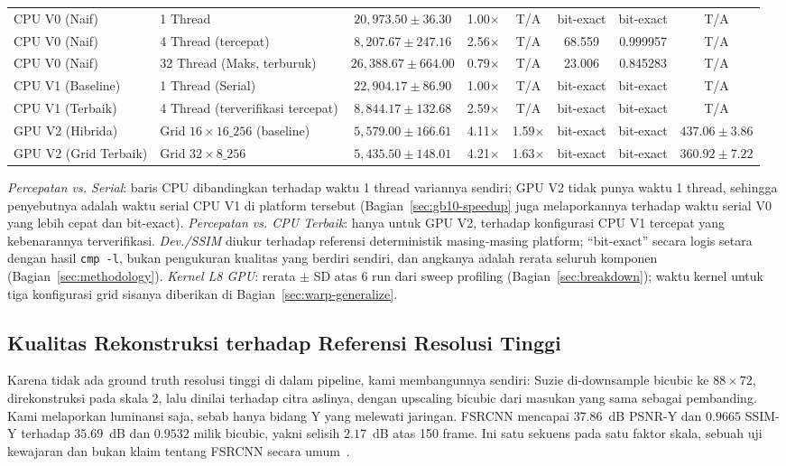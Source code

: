\documentclass[conference]{IEEEtran}
\begin{document}
\begin{table}[htbp]
{\begin{tabular}{llcccccc}
CPU V0 (Naif) & 1 Thread & $20{,}973.50 \pm 36.30$ & 1.00$\times$ & T/A & bit-exact & bit-exact & T/A \\
CPU V0 (Naif) & 4 Thread (tercepat) & $8{,}207.67 \pm 247.16$ & 2.56$\times$ & T/A & 68.559 & 0.999957 & T/A \\
CPU V0 (Naif) & 32 Thread (Maks, terburuk) & $26{,}388.67 \pm 664.00$ & 0.79$\times$ & T/A & 23.006 & 0.845283 & T/A \\
CPU V1 (Baseline) & 1 Thread (Serial) & $22{,}904.17 \pm 86.90$ & 1.00$\times$ & T/A & bit-exact & bit-exact & T/A \\
CPU V1 (Terbaik) & 4 Thread (terverifikasi tercepat) & $8{,}844.17 \pm 132.68$ & 2.59$\times$ & T/A & bit-exact & bit-exact & T/A \\
GPU V2 (Hibrida) & Grid $16{\times}16\_256$ (baseline) & $5{,}579.00 \pm 166.61$ & 4.11$\times$ & 1.59$\times$ & bit-exact & bit-exact & $437.06 \pm 3.86$ \\
GPU V2 (Grid Terbaik) & Grid $32{\times}8\_256$ & $5{,}435.50 \pm 148.01$ & 4.21$\times$ & 1.63$\times$ & bit-exact & bit-exact & $360.92 \pm 7.22$ \\
\bottomrule
\end{tabular}%
}

\vspace{2mm}
\footnotesize{\emph{Percepatan vs. Serial}: baris CPU dibandingkan terhadap waktu 1 thread variannya sendiri; GPU V2 tidak punya waktu 1 thread, sehingga penyebutnya adalah waktu serial CPU V1 di platform tersebut (Bagian~\ref{sec:gb10-speedup} juga melaporkannya terhadap waktu serial V0 yang lebih cepat dan bit-exact). \emph{Percepatan vs. CPU Terbaik}: hanya untuk GPU V2, terhadap konfigurasi CPU V1 tercepat yang kebenarannya terverifikasi. \emph{Dev./SSIM} diukur terhadap referensi deterministik masing-masing platform; ``bit-exact'' secara logis setara dengan hasil \texttt{cmp -l}, bukan pengukuran kualitas yang berdiri sendiri, dan angkanya adalah rerata seluruh komponen (Bagian~\ref{sec:methodology}). \emph{Kernel L8 GPU}: rerata $\pm$ SD atas 6 run dari sweep profiling (Bagian~\ref{sec:breakdown}); waktu kernel untuk tiga konfigurasi grid sisanya diberikan di Bagian~\ref{sec:warp-generalize}.}
\end{table}

\subsection{Kualitas Rekonstruksi terhadap Referensi Resolusi Tinggi}
\label{sec:quality}
Karena tidak ada ground truth resolusi tinggi di dalam pipeline, kami membangunnya sendiri: Suzie di-downsample bicubic ke $88{\times}72$, direkonstruksi pada skala 2, lalu dinilai terhadap citra aslinya, dengan upscaling bicubic dari masukan yang sama sebagai pembanding. Kami melaporkan luminansi saja, sebab hanya bidang Y yang melewati jaringan. FSRCNN mencapai $37.86$~dB PSNR-Y dan $0.9665$ SSIM-Y terhadap $35.69$~dB dan $0.9532$ milik bicubic, yakni selisih $2.17$~dB atas 150 frame. Ini satu sekuens pada satu faktor skala, sebuah uji kewajaran dan bukan klaim tentang FSRCNN secara umum~\cite{dong2016fsrcnn}.
\end{document}
